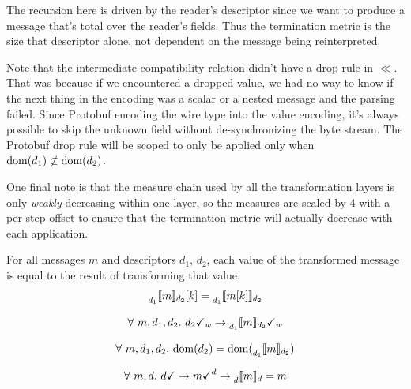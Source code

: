 The recursion here is driven by the reader's descriptor since we want to produce
a message that's total over the reader's fields. Thus the termination metric is
the size that descriptor alone, not dependent on the message being
reinterpreted.

Note that the intermediate compatibility relation didn't have a drop rule in
$\ll$. That was because if we encountered a dropped value, we had no way to know
if the next thing in the encoding was a scalar or a nested message and the
parsing failed. Since Protobuf encoding the wire type into the value encoding,
it's always possible to skip the unknown field without de-synchronizing the byte
stream. The Protobuf drop rule will be scoped to only be applied only when
$\mathrm{dom}(d_1) \not \subset \mathrm{dom}(d_2)$.

One final note is that the measure chain used by all the transformation layers
is only \emph{weakly} decreasing within one layer, so the measures are scaled by
4 with a per-step offset to ensure that the termination metric will actually
decrease with each application. 

\vspace{1em}
\begin{theorem}
  For all messages $m$ and descriptors $d_1$, $d_2$, each value of the
  transformed message is equal to the result of transforming that value.
  \[ \prescript{}{d_1}{\llbracket{} m \rrbracket{}}_{d_2}[k] = \prescript{}{d_1}{\llbracket{} m[k] \rrbracket{}}_{d_2} \]
\end{theorem}

\vspace{1em}
\begin{theorem}[Transform WF]\label{thm:trans-wf}
  \[ \forall\ m, d_1, d_2.\ d_2 \checkmark_w \rightarrow \prescript{}{d_1}{\llbracket{} m \rrbracket{}}_{d_2} \checkmark_w \]
\end{theorem}

\vspace{1em}
\begin{theorem}\label{thm:trans-total}
  \[ \forall\ m, d_1, d_2.\ \mathrm{dom}(d_2) = \mathrm{dom}(\prescript{}{d_1}{\llbracket{} m \rrbracket{}}_{d_2}) \]
\end{theorem}

\vspace{1em}
\begin{theorem}\label{thm:trans-self}
  \[ \forall\ m, d.\ d \checkmark \rightarrow m \checkmark^d \rightarrow \prescript{}{d}{\llbracket{} m \rrbracket{}}_{d} = m \]
\end{theorem}

